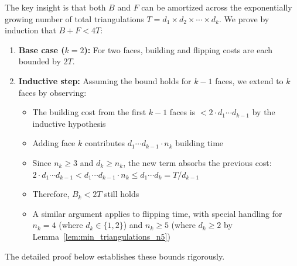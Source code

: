 \documentclass[12pt,a4paper]{article}
\theoremstyle{definition}
\theoremstyle{remark}
\begin{document}
The key insight is that both $B$ and $F$ can be amortized across the exponentially growing number of total triangulations $T = d_1 \times d_2 \times \cdots \times d_k$. We prove by induction that $B + F < 4T$:

\begin{enumerate}
    \item \textbf{Base case ($k = 2$):} For two faces, building and flipping costs are each bounded by $2T$.
    \item \textbf{Inductive step:} Assuming the bound holds for $k-1$ faces, we extend to $k$ faces by observing:
    \begin{itemize}
        \item The building cost from the first $k-1$ faces is $< 2 \cdot d_1 \cdots d_{k-1}$ by the inductive hypothesis
        \item Adding face $k$ contributes $d_1 \cdots d_{k-1} \cdot n_k$ building time
        \item Since $n_k \geq 3$ and $d_k \geq n_k$, the new term absorbs the previous cost: $2 \cdot d_1 \cdots d_{k-1} < d_1 \cdots d_{k-1} \cdot n_k \leq d_1 \cdots d_k = T/d_{k-1}$
        \item Therefore, $B_k < 2T$ still holds
        \item A similar argument applies to flipping time, with special handling for $n_k = 4$ (where $d_k \in \{1, 2\}$) and $n_k \geq 5$ (where $d_k \geq 2$ by Lemma~\ref{lem:min_triangulations_n5})
    \end{itemize}
\end{enumerate}

The detailed proof below establishes these bounds rigorously.
\end{document}
